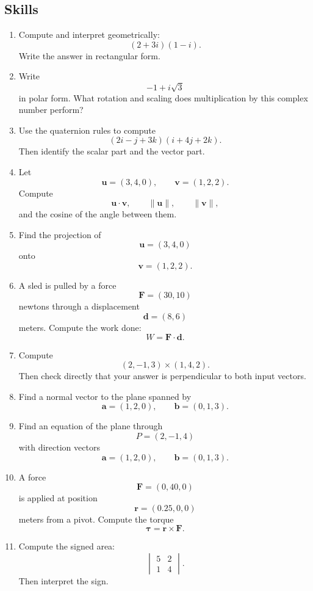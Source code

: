 \subsection{Skills}

\begin{enumerate}
\item Compute and interpret geometrically:
\[
    (2+3i)(1-i).
\]
Write the answer in rectangular form.

\item Write
\[
    -1+i\sqrt3
\]
in polar form.  What rotation and scaling does multiplication by this complex number
perform?

\item Use the quaternion rules to compute
\[
    (2i-j+3k)(i+4j+2k).
\]
Then identify the scalar part and the vector part.

\item Let
\[
    \mathbf u=(3,4,0),
    \qquad
    \mathbf v=(1,2,2).
\]
Compute
\[
    \mathbf u\cdot\mathbf v,
    \qquad
    \|\mathbf u\|,
    \qquad
    \|\mathbf v\|,
\]
and the cosine of the angle between them.

\item Find the projection of
\[
    \mathbf u=(3,4,0)
\]
onto
\[
    \mathbf v=(1,2,2).
\]

\item A sled is pulled by a force
\[
    \mathbf F=(30,10)
\]
newtons through a displacement
\[
    \mathbf d=(8,6)
\]
meters.  Compute the work done:
\[
    W=\mathbf F\cdot\mathbf d.
\]

\item Compute
\[
    (2,-1,3)\times(1,4,2).
\]
Then check directly that your answer is perpendicular to both input vectors.

\item Find a normal vector to the plane spanned by
\[
    \mathbf a=(1,2,0),
    \qquad
    \mathbf b=(0,1,3).
\]

\item Find an equation of the plane through
\[
    P=(2,-1,4)
\]
with direction vectors
\[
    \mathbf a=(1,2,0),
    \qquad
    \mathbf b=(0,1,3).
\]

\item A force
\[
    \mathbf F=(0,40,0)
\]
is applied at position
\[
    \mathbf r=(0.25,0,0)
\]
meters from a pivot.  Compute the torque
\[
    \boldsymbol\tau=\mathbf r\times\mathbf F.
\]

\item Compute the signed area:
\[
    \begin{vmatrix}
        5&2\\
        1&4
    \end{vmatrix}.
\]
Then interpret the sign.


\end{enumerate}
